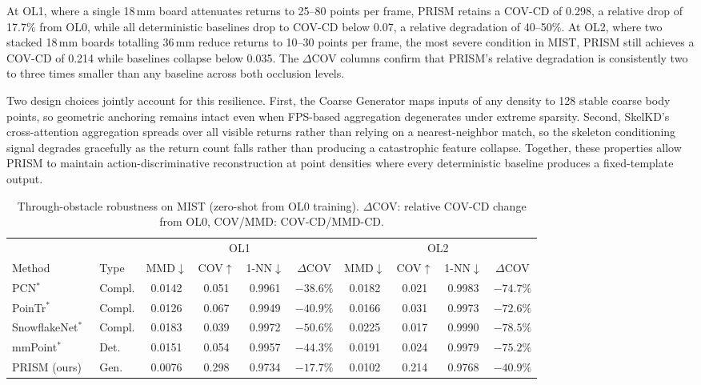 \documentclass{article}
\begin{document}
At OL1, where a single 18\,mm board attenuates returns to 25--80 points per frame,
PRISM retains a COV-CD of 0.298, a relative drop of 17.7\% from OL0, while all
deterministic baselines drop to COV-CD below 0.07, a relative degradation of
40--50\%.
At OL2, where two stacked 18\,mm boards totalling 36\,mm reduce returns to 10--30 points
per frame, the most severe condition in MIST, PRISM still achieves
a COV-CD of 0.214 while baselines collapse below 0.035.
The $\Delta$COV columns confirm that PRISM's relative degradation is consistently
two to three times smaller than any baseline across both occlusion levels.

Two design choices jointly account for this resilience.
First, the Coarse Generator maps inputs of any density to 128 stable coarse body points,
so geometric anchoring remains intact even when FPS-based aggregation degenerates
under extreme sparsity.
Second, SkelKD's cross-attention aggregation spreads over all visible returns
rather than relying on a nearest-neighbor match, so the skeleton conditioning signal
degrades gracefully as the return count falls rather than producing a catastrophic
feature collapse.
Together, these properties allow PRISM to maintain action-discriminative
reconstruction at point densities where every deterministic baseline produces a
fixed-template output.


\begin{table}[h]
  \centering
  \caption{Through-obstacle robustness on MIST (zero-shot from OL0 training). $\Delta$COV: relative COV-CD change from OL0, COV/MMD: COV-CD/MMD-CD.}
  \label{tab:mist_per_level}
  \small
  \setlength{\tabcolsep}{3.5pt}
  \begin{tabular}{ll cccc cccc}
    \toprule
    & & \multicolumn{4}{c}{OL1} & \multicolumn{4}{c}{OL2} \\
    \cmidrule(r){3-6}\cmidrule(l){7-10}
    Method & Type
      & MMD$\downarrow$ & COV$\uparrow$ & 1-NN$\downarrow$ & $\Delta$COV
      & MMD$\downarrow$ & COV$\uparrow$ & 1-NN$\downarrow$ & $\Delta$COV \\
    \midrule
    PCN$^*$~\cite{yuan2018pcn}
      & Compl. & 0.0142 & 0.051 & 0.9961 & $-38.6\%$
               & 0.0182 & 0.021 & 0.9983 & $-74.7\%$ \\
    PoinTr$^*$~\cite{yu2021pointr}
      & Compl. & 0.0126 & 0.067 & 0.9949 & $-40.9\%$
               & 0.0166 & 0.031 & 0.9973 & $-72.6\%$ \\
    SnowflakeNet$^*$~\cite{xiang2021snowflakenet}
      & Compl. & 0.0183 & 0.039 & 0.9972 & $-50.6\%$
               & 0.0225 & 0.017 & 0.9990 & $-78.5\%$ \\
    mmPoint$^*$~\cite{xie2023mmpoint}
      & Det.   & 0.0151 & 0.054 & 0.9957 & $-44.3\%$
               & 0.0191 & 0.024 & 0.9979 & $-75.2\%$ \\
    PRISM (ours)
      & Gen.   & 0.0076 & 0.298 & 0.9734 & $-17.7\%$
               & 0.0102 & 0.214 & 0.9768 & $-40.9\%$ \\
    \bottomrule
  \end{tabular}
\end{table}
\end{document}
